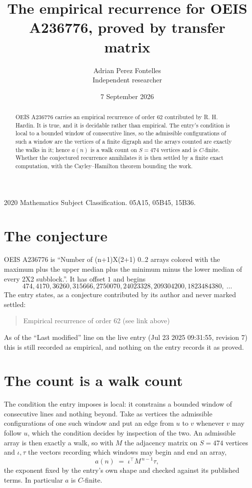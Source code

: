 \documentclass[11pt,a4paper]{article}
\title{The empirical recurrence for OEIS A236776, proved by transfer matrix}
\author{Adrian Perez Fontelles\\ \small Independent researcher}
\date{7 September 2026}
\theoremstyle{plain}
\theoremstyle{definition}
\begin{document}
\maketitle

\begin{abstract}
OEIS A236776 carries an empirical recurrence of order $62$ contributed by R. H. Hardin. It is
true, and it is decidable rather than empirical. The entry's condition is local to a bounded window of consecutive lines, so
the admissible configurations of such a window are the vertices of a finite digraph and the
arrays counted are exactly the walks in it; hence $a(n)$ is a walk count on $S=474$ vertices
and is $C$-finite. Whether the conjectured recurrence annihilates it is then settled by a
finite exact computation, with the Cayley--Hamilton theorem bounding the work.
\end{abstract}

\noindent\small 2020 Mathematics Subject Classification. 05A15, 05B45, 15B36.\normalsize

\section{The conjecture}

OEIS A236776 is ``Number of (n+1)X(2+1) 0..2 arrays colored with the maximum plus the upper median plus the minimum minus the lower median of every 2X2 subblock.''. It has offset $1$ and begins
\[
474, 4170, 36260, 315666, 2750070, 24023328, 209304200, 1823484380,\ \dots
\]
The entry states, as a conjecture contributed by its author and never marked settled:
\begin{quote}
Empirical recurrence of order 62 (see link above)
\end{quote}
As of the ``Last modified'' line on the live entry (Jul 23 2025 09:31:55, revision 7) this is still
recorded as empirical, and nothing on the entry records it as proved.

\section{The count is a walk count}

The condition the entry imposes is local: it constrains a bounded window of consecutive lines and nothing beyond. Take as
vertices the admissible configurations of one such window and put an edge from $u$ to $v$
whenever $v$ may follow $u$, which the condition decides by inspection of the two. An
admissible array is then exactly a walk, so with $M$ the adjacency matrix on $S=474$ vertices
and $\iota,\tau$ the vectors recording which windows may begin and end an array,
\[
a(n)\;=\;\iota^{\!\top}M^{\,n-1}\tau ,
\]
the exponent fixed by the entry's own shape and checked against its published terms. In
particular $a$ is $C$-finite.
\end{document}
